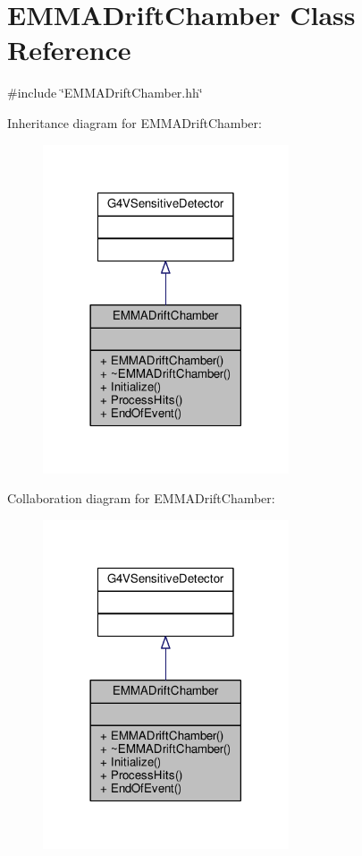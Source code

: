 \hypertarget{classEMMADriftChamber}{}\section{E\+M\+M\+A\+Drift\+Chamber Class Reference}
\label{classEMMADriftChamber}


{\ttfamily \#include \char`\"{}E\+M\+M\+A\+Drift\+Chamber.\+hh\char`\"{}}



Inheritance diagram for E\+M\+M\+A\+Drift\+Chamber\+:
\nopagebreak
\begin{figure}[H]
\begin{center}
\leavevmode
\includegraphics[width=206pt]{classEMMADriftChamber__inherit__graph}
\end{center}
\end{figure}


Collaboration diagram for E\+M\+M\+A\+Drift\+Chamber\+:
\nopagebreak
\begin{figure}[H]
\begin{center}
\leavevmode
\includegraphics[width=206pt]{classEMMADriftChamber__coll__graph}
\end{center}
\end{figure}
